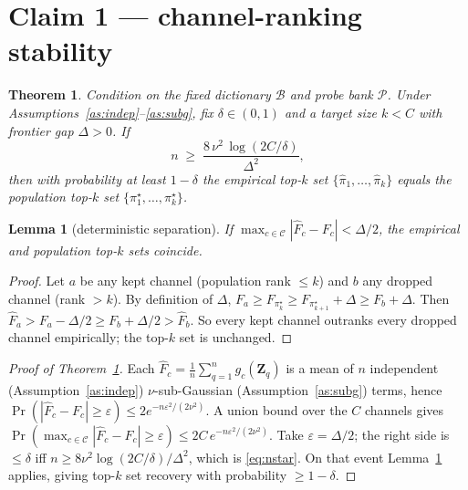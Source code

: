 \documentclass[11pt]{article}
\newtheorem{theorem}{Theorem}
\newtheorem{lemma}{Lemma}
\begin{document}
\section{Claim 1 --- channel-ranking stability}

\begin{theorem}\label{thm:rank}
Condition on the fixed dictionary $\mathcal{B}$ and probe bank $\mathcal{P}$. Under
Assumptions~\ref{as:indep}--\ref{as:subg}, fix $\delta\in(0,1)$ and a target size $k<C$
with frontier gap $\Delta>0$. If
\begin{equation}\label{eq:nstar}
n\;\ge\;\frac{8\,\nu^2\,\log(2C/\delta)}{\Delta^2},
\end{equation}
then with probability at least $1-\delta$ the empirical top-$k$ set
$\{\widehat\pi_1,\dots,\widehat\pi_k\}$ equals the population top-$k$ set
$\{\pi^\star_1,\dots,\pi^\star_k\}$.
\end{theorem}

\begin{lemma}[deterministic separation]\label{lem:det}
If $\max_{c\in\mathcal{C}}|\widehat F_c-F_c|<\Delta/2$, the empirical and population top-$k$ sets
coincide.
\end{lemma}
\begin{proof}
Let $a$ be any kept channel (population rank $\le k$) and $b$ any dropped channel (rank
$>k$). By definition of $\Delta$, $F_a\ge F_{\pi^\star_k}\ge
F_{\pi^\star_{k+1}}+\Delta\ge F_b+\Delta$. Then
$\widehat F_a> F_a-\Delta/2\ge F_b+\Delta/2>\widehat F_b$. So every kept channel outranks
every dropped channel empirically; the top-$k$ set is unchanged.
\end{proof}

\begin{proof}[Proof of Theorem~\ref{thm:rank}]
Each $\widehat F_c=\frac1n\sum_{q=1}^{n} g_c(\mathbf{Z}_q)$ is a mean of $n$ independent
(Assumption~\ref{as:indep}) $\nu$-sub-Gaussian (Assumption~\ref{as:subg}) terms, hence
$\Pr(|\widehat F_c-F_c|\ge\varepsilon)\le 2e^{-n\varepsilon^2/(2\nu^2)}$. A union bound
over the $C$ channels gives
$\Pr(\max_{c\in\mathcal{C}}|\widehat F_c-F_c|\ge\varepsilon)\le
2C\,e^{-n\varepsilon^2/(2\nu^2)}$.
Take $\varepsilon=\Delta/2$; the right side is $\le\delta$ iff
$n\ge 8\nu^2\log(2C/\delta)/\Delta^2$, which is \eqref{eq:nstar}. On that event
Lemma~\ref{lem:det} applies, giving top-$k$ set recovery with probability $\ge1-\delta$.
\end{proof}
\end{document}

